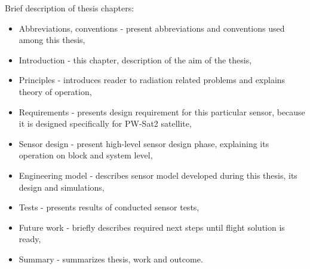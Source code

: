     Brief description of thesis chapters:
    \begin{itemize}
        \item Abbreviations, conventions - present abbreviations and conventions used among this thesis,
        \item Introduction - this chapter, description of the aim of the thesis,
        \item Principles - introduces reader to radiation related problems and explains theory of operation,
        \item Requirements - presents design requirement for this particular sensor, because it is designed specifically for PW-Sat2 satellite,
        \item Sensor design - present high-level sensor design phase, explaining its operation on block and system level,
        \item Engineering model - describes sensor model developed during this thesis, its design and simulations,
        \item Tests - presents results of conducted sensor tests,
        \item Future work - briefly describes required next steps until flight solution is ready,
        \item Summary - summarizes thesis, work and outcome.
    \end{itemize}

